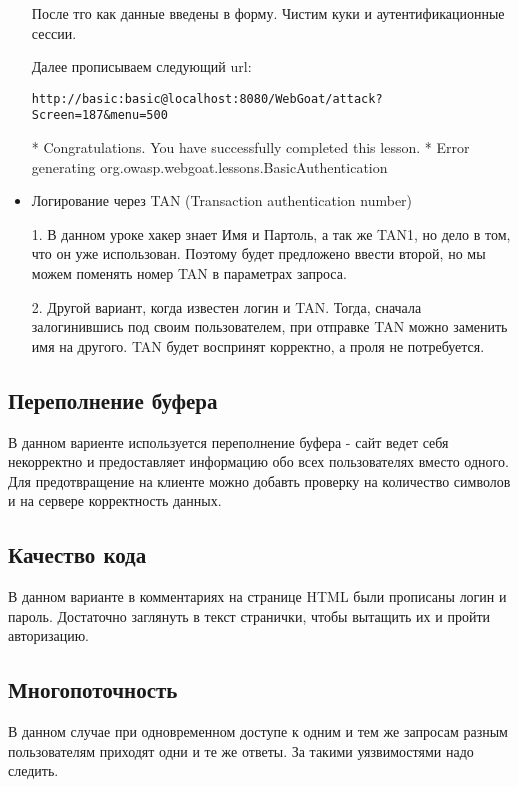 \documentclass{article}
\begin{document}
\begin{itemize}
	После тго как данные введены в форму. Чистим куки и аутентификационные сессии.
	
	Далее прописываем следующий url: 
	
	\verb'http://basic:basic@localhost:8080/WebGoat/attack?Screen=187&menu=500'
	
	* Congratulations. You have successfully completed this lesson.
	* Error generating org.owasp.webgoat.lessons.BasicAuthentication
	
	
	\item Логирование через TAN (Transaction authentication number)
	
	1. В данном уроке хакер знает Имя и Партоль, а так же TAN1, но дело в том, что он уже использован. Поэтому будет предложено ввести второй, но мы можем поменять номер TAN в параметрах запроса.
	
	2. Другой вариант, когда известен логин и TAN. Тогда, сначала залогинившись под своим пользователем, при отправке TAN можно заменить имя на другого. TAN будет воспринят корректно, а проля не потребуется.
	
\end{itemize}


\subsection{Переполнение буфера}

В данном вариенте используется переполнение буфера - сайт ведет себя некорректно и предоставляет информацию обо всех пользователях вместо одного. 
Для предотвращение на клиенте можно добавть проверку на количество символов и на сервере корректность данных.


\subsection{Качество кода}

В данном варианте в комментариях на странице HTML были прописаны логин и пароль. Достаточно заглянуть в текст странички, чтобы вытащить их и пройти авторизацию.

\subsection{Многопоточность}

В данном случае при одновременном доступе к одним и тем же запросам разным пользователям приходят одни и те же ответы. За такими уязвимостями надо следить.
\end{document}
